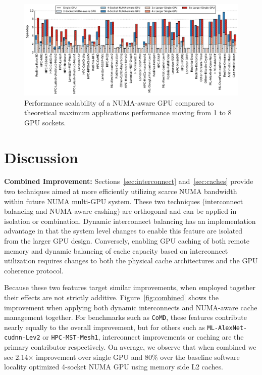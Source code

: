 \begin{figure}[t]
    \centering
    \includegraphics[width=1.0\textwidth]{figures/plot_scalability_mgpu_WB.pdf}
    \caption{Performance scalability of a NUMA-aware GPU compared to theoretical 
    maximum applications performance moving from 1 to 8 GPU sockets.}
    \label{fig:scalability}
    \vspace{-.2in}
\end{figure}

\section {Discussion}
\label{sec:discussion}
\textbf{Combined Improvement:} Sections~\ref{sec:interconnect} 
and~\ref{sec:caches} provide two techniques aimed at more efficiently utilizing 
scarce NUMA bandwidth within future NUMA multi-GPU system. These two 
techniques (interconnect balancing and NUMA-aware cashing) are orthogonal and 
can be applied in isolation or combination.  Dynamic interconnect balancing 
has an implementation advantage in that the system level changes to enable 
this feature are isolated from the larger GPU design.  Conversely, enabling 
GPU caching of both remote memory and dynamic balancing of cache capacity 
based on interconnect utilization requires changes to both the physical cache 
architectures and the GPU coherence protocol.

Because these two features target similar improvements, when employed 
together their effects are not strictly additive.  Figure~\ref{fig:combined} 
shows the improvement when applying both dynamic interconnects and NUMA-aware 
cache management together.  For benchmarks such as \texttt{CoMD}, these 
features contribute nearly equally to the overall improvement, but for others 
such as \texttt{ML-AlexNet-cudnn-Lev2} or \texttt{HPC-MST-Mesh1}, 
interconnect improvements or caching are the primary contributor 
respectively.  On average, we observe that when combined we see 2.14$\times$ improvement over single GPU and 80\% 
over the baseline software locality optimized 4-socket NUMA GPU 
using memory side L2 caches.

